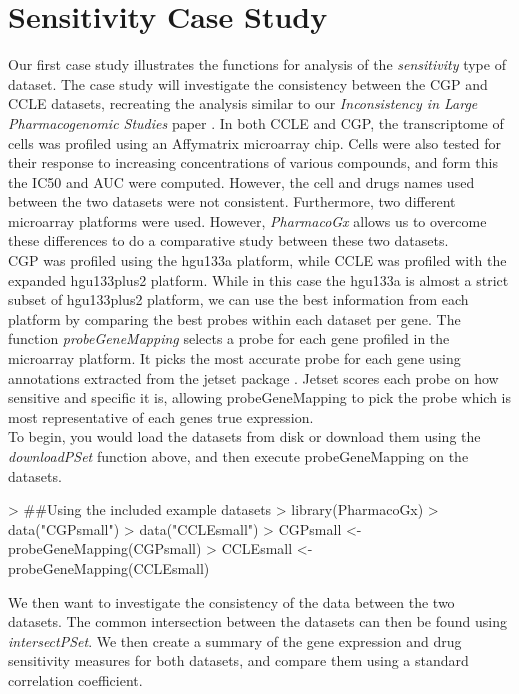 \documentclass[11pt]{article}
\begin{document}
\section{Sensitivity Case Study}

Our first case study illustrates the functions for analysis of the \textit{sensitivity} type of dataset. The case study will investigate the consistency between the CGP and CCLE datasets, recreating the analysis similar to our \textit{Inconsistency in Large Pharmacogenomic Studies} paper \cite{HaibeKains:2013ie}. In both CCLE and CGP, the transcriptome of cells was profiled using an Affymatrix microarray chip. Cells were also tested for their response to increasing concentrations of various compounds, and form this the IC50 and AUC were computed. However, the cell and drugs names used between the two datasets were not consistent. Furthermore, two different microarray platforms were used. However, \textit{PharmacoGx} allows us to overcome these differences to do a comparative study between these two datasets. \\


CGP was profiled using the hgu133a platform, while CCLE was profiled with the expanded hgu133plus2 platform. While in this case the hgu133a is almost a strict subset of hgu133plus2 platform, we can use the best information from each platform by comparing the best probes within each dataset per gene. The function \textit{probeGeneMapping} selects a probe for each gene profiled in the microarray platform. It picks the most accurate probe for each gene using annotations extracted from the jetset package \cite{Li:2011cc}. Jetset scores each probe on how sensitive and specific it is, allowing probeGeneMapping to pick the probe which is most representative of each genes true expression. \\

To begin, you would load the datasets from disk or download them using the \textit{downloadPSet} function above, and then execute probeGeneMapping on the datasets. 

\begin{Schunk}
\begin{Sinput}
>   ##Using the included example datasets
>   library(PharmacoGx)
>   data("CGPsmall")
>   data("CCLEsmall")
>   CGPsmall <- probeGeneMapping(CGPsmall) 
>   CCLEsmall <- probeGeneMapping(CCLEsmall) 
\end{Sinput}
\end{Schunk}
We then want to investigate the consistency of the data between the two datasets. The common intersection between the datasets can then be found using \textit{intersectPSet}. We then create a summary of the gene expression and drug sensitivity measures for both datasets, and compare them using a standard correlation coefficient. 
\end{document}
